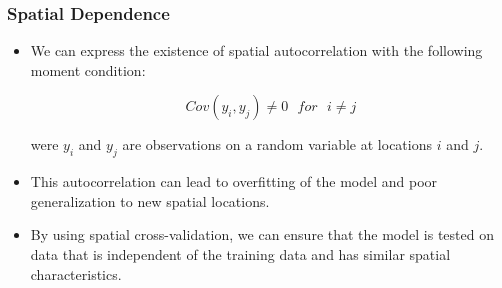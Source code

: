 \documentclass[
  shownotes,
  xcolor={svgnames},
  hyperref={colorlinks,citecolor=DarkBlue,linkcolor=andesred,urlcolor=DarkBlue}
  , aspectratio=169]{beamer}
\begin{document}
\begin{frame}[fragile]
\frametitle{Spatial Dependence}

\begin{itemize}

  \medskip
  \item  We can express the existence of spatial autocorrelation with the following moment condition:
\medskip


\begin{equation}
 Cov(y_{i},y_{j})\neq 0\,\,\,\,for\,\,\,\,i\neq j
\end{equation}

were \(y_i\) and \(y_j\) are observations on a random variable at locations \(i\) and \(j\). 
\medskip
  \item This autocorrelation can lead to overfitting of the model and poor generalization to new spatial locations. 
  \medskip
  \item By using spatial cross-validation, we can ensure that the model is tested on data that is independent of the training data and has similar spatial characteristics.
\end{itemize}

\end{frame}
\end{document}
